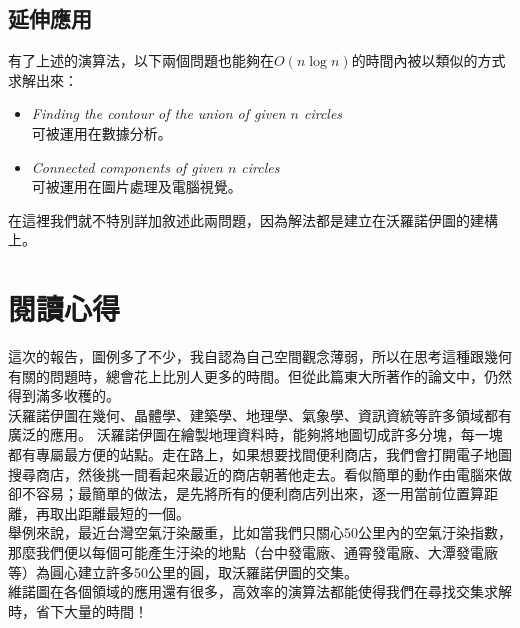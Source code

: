 \documentclass[15pt]{extarticle}
\begin{document}
\subsection{延伸應用}
有了上述的演算法，以下兩個問題也能夠在$O(n\log n)$的時間內被以類似的方式求解出來：

\begin{itemize}
    \item \textit{Finding the contour of the union of given $n$ circles} \\    
        可被運用在數據分析。
    \item \textit{Connected components of given $n$ circles} \\
        可被運用在圖片處理及電腦視覺。
\end{itemize}

在這裡我們就不特別詳加敘述此兩問題，因為解法都是建立在沃羅諾伊圖的建構上。

\newpage
\section{閱讀心得}

這次的報告，圖例多了不少，我自認為自己空間觀念薄弱，所以在思考這種跟幾何有關的問題時，總會花上比別人更多的時間。但從此篇東大所著作的論文中，仍然得到滿多收穫的。\\

沃羅諾伊圖在幾何、晶體學、建築學、地理學、氣象學、資訊資統等許多領域都有廣泛的應用。
沃羅諾伊圖在繪製地理資料時，能夠將地圖切成許多分塊，每一塊都有專屬最方便的站點。走在路上，如果想要找間便利商店，我們會打開電子地圖搜尋商店，然後挑一間看起來最近的商店朝著他走去。看似簡單的動作由電腦來做卻不容易；最簡單的做法，是先將所有的便利商店列出來，逐一用當前位置算距離，再取出距離最短的一個。\\

舉例來說，最近台灣空氣汙染嚴重，比如當我們只關心50公里內的空氣汙染指數，那麼我們便以每個可能產生汙染的地點（台中發電廠、通霄發電廠、大潭發電廠等）為圓心建立許多50公里的圓，取沃羅諾伊圖的交集。\\

維諾圖在各個領域的應用還有很多，高效率的演算法都能使得我們在尋找交集求解時，省下大量的時間！
\end{document}
